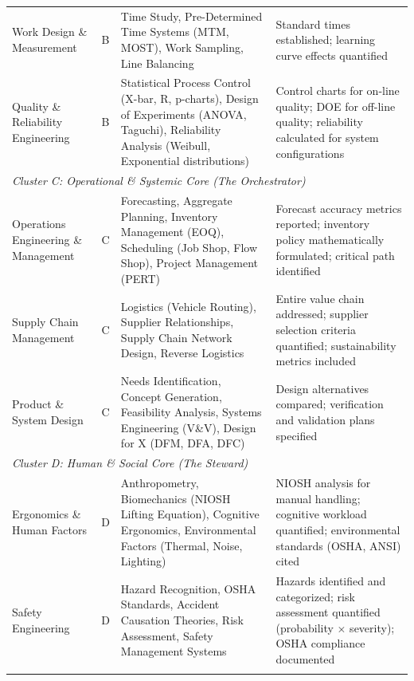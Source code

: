 \begin{table}[h]
\begin{tabular}{@{}p{3.5cm}cp{4cm}p{5cm}@{}}
Work Design \& Measurement & B & Time Study, Pre-Determined Time Systems (MTM, MOST), Work Sampling, Line Balancing & Standard times established; learning curve effects quantified \\
\addlinespace

Quality \& Reliability Engineering & B & Statistical Process Control (X-bar, R, p-charts), Design of Experiments (ANOVA, Taguchi), Reliability Analysis (Weibull, Exponential distributions) & Control charts for on-line quality; DOE for off-line quality; reliability calculated for system configurations \\
\midrule

\multicolumn{4}{l}{\textit{Cluster C: Operational \& Systemic Core (The Orchestrator)}} \\
\midrule

Operations Engineering \& Management & C & Forecasting, Aggregate Planning, Inventory Management (EOQ), Scheduling (Job Shop, Flow Shop), Project Management (PERT) & Forecast accuracy metrics reported; inventory policy mathematically formulated; critical path identified \\
\addlinespace

Supply Chain Management & C & Logistics (Vehicle Routing), Supplier Relationships, Supply Chain Network Design, Reverse Logistics & Entire value chain addressed; supplier selection criteria quantified; sustainability metrics included \\
\addlinespace

Product \& System Design & C & Needs Identification, Concept Generation, Feasibility Analysis, Systems Engineering (V\&V), Design for X (DFM, DFA, DFC) & Design alternatives compared; verification and validation plans specified \\
\midrule

\multicolumn{4}{l}{\textit{Cluster D: Human \& Social Core (The Steward)}} \\
\midrule

Ergonomics \& Human Factors & D & Anthropometry, Biomechanics (NIOSH Lifting Equation), Cognitive Ergonomics, Environmental Factors (Thermal, Noise, Lighting) & NIOSH analysis for manual handling; cognitive workload quantified; environmental standards (OSHA, ANSI) cited \\
\addlinespace

Safety Engineering & D & Hazard Recognition, OSHA Standards, Accident Causation Theories, Risk Assessment, Safety Management Systems & Hazards identified and categorized; risk assessment quantified (probability $\times$ severity); OSHA compliance documented \\
\addlinespace


\end{tabular}
\end{table}
